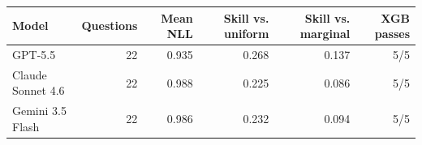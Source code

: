 \begin{tabular}{lrrrrr}\toprule
Model & Questions & Mean NLL & Skill vs. uniform & Skill vs. marginal & XGB passes \\
\midrule
GPT-5.5 & 22 & 0.935 & 0.268 & 0.137 & 5/5 \\
Claude Sonnet 4.6 & 22 & 0.988 & 0.225 & 0.086 & 5/5 \\
Gemini 3.5 Flash & 22 & 0.986 & 0.232 & 0.094 & 5/5 \\
\bottomrule\end{tabular}
